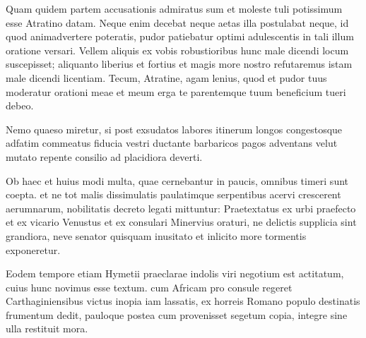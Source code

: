 Quam quidem partem accusationis admiratus sum et moleste tuli potissimum esse Atratino datam. Neque enim decebat neque 
aetas illa postulabat neque, id quod animadvertere poteratis, pudor patiebatur optimi adulescentis in tali illum oratione versari. 
Vellem aliquis ex vobis robustioribus hunc male dicendi locum suscepisset; aliquanto liberius et fortius et magis more nostro 
refutaremus istam male dicendi licentiam. Tecum, Atratine, agam lenius, quod et pudor tuus moderatur orationi meae et meum 
erga te parentemque tuum beneficium tueri debeo.

Nemo quaeso miretur, si post exsudatos labores itinerum longos congestosque adfatim commeatus fiducia vestri ductante 
barbaricos pagos adventans velut mutato repente consilio ad placidiora deverti.

Ob haec et huius modi multa, quae cernebantur in paucis, omnibus timeri sunt coepta. et ne tot malis dissimulatis paulatimque 
serpentibus acervi crescerent aerumnarum, nobilitatis decreto legati mittuntur: Praetextatus ex urbi praefecto et ex vicario 
Venustus et ex consulari Minervius oraturi, ne delictis supplicia sint grandiora, neve senator quisquam inusitato et inlicito more 
tormentis exponeretur.

Eodem tempore etiam Hymetii praeclarae indolis viri negotium est actitatum, cuius hunc novimus esse textum. cum Africam pro 
consule regeret Carthaginiensibus victus inopia iam lassatis, ex horreis Romano populo destinatis frumentum dedit, pauloque 
postea cum provenisset segetum copia, integre sine ulla restituit mora.
